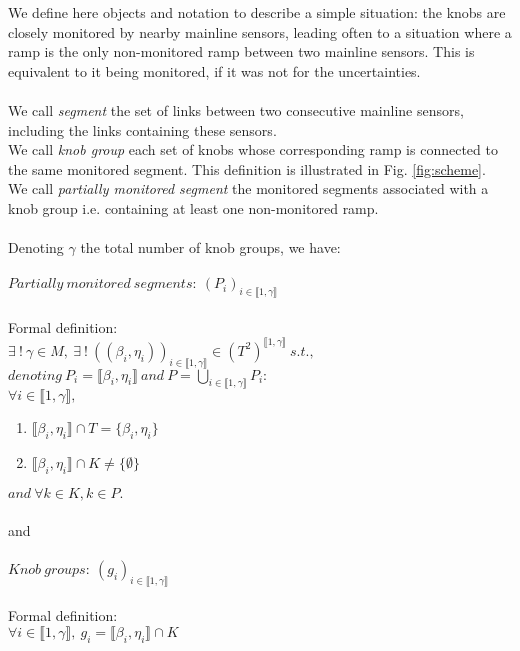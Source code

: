 We define here objects and notation to describe a simple situation: the knobs are closely monitored by nearby mainline sensors, leading often to a situation where a ramp is the only non-monitored ramp between two mainline sensors. This is equivalent to it being monitored, if it was not for the uncertainties.\\
\\
We call \emph{segment} the set of links between two consecutive mainline sensors, including the links containing these sensors. \\
We call \emph{knob group} each set of knobs whose corresponding ramp is connected to the same monitored segment.
This definition is illustrated in Fig. \ref{fig:scheme}.\\
We call \emph{partially monitored segment} the monitored segments associated with a knob group i.e. containing at least one non-monitored ramp.\\
\\
Denoting $\gamma$ the total number of knob groups, we have:\\
\\
$Partially\ monitored\ segments:\ (P_{i})_{i \in \llbracket 1,\gamma \rrbracket}$\\ 
\\
Formal definition:\\
$\exists\ !\ \gamma\in M,\ \exists\ !\ ((\beta_{i},\eta_{i}))_{i\in\llbracket 1,\gamma\rrbracket}\in (T^2)^{\llbracket 1,\gamma\rrbracket}\ s.t.,$\\
$denoting\ P_{i}=\llbracket \beta_{i},\eta_{i} \rrbracket\ and\ P=\underset{i\in \llbracket 1,\gamma \rrbracket}{\bigcup}  P_{i}:$\\
$\forall i\in\llbracket 1,\gamma \rrbracket,$
\begin{enumerate}
	\item $\llbracket \beta_{i},\eta_{i} \rrbracket \cap T=\{\beta_{i},\eta_{i}\}$
	\item $\llbracket \beta_{i}, \eta_{i} \rrbracket \cap K\not= \{\emptyset \}$
\end{enumerate}
$and\ \forall k\in K, k\in P.$\\
\\
and\\
\\
$Knob\ groups:\ (g_{i})_{i\in \llbracket 1,\gamma \rrbracket}$\\
\\
Formal definition:\\
$\forall i \in \llbracket 1, \gamma \rrbracket,\ g_{i}=\llbracket \beta_{i}, \eta_{i} \rrbracket \cap K $\\
